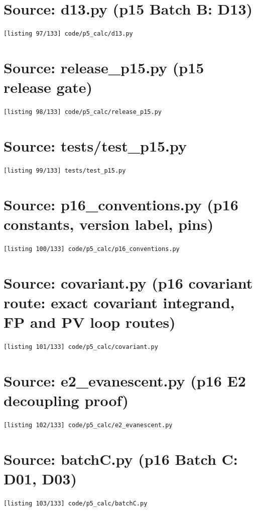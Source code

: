 \section{Source: d13.py (p15 Batch B: D13)}
\noindent\texttt{[listing 97/133] code/p5\_calc/d13.py}
{\scriptsize}

\section{Source: release\_p15.py (p15 release gate)}
\noindent\texttt{[listing 98/133] code/p5\_calc/release\_p15.py}
{\scriptsize}

\section{Source: tests/test\_p15.py}
\noindent\texttt{[listing 99/133] tests/test\_p15.py}
{\scriptsize}

\section{Source: p16\_conventions.py (p16 constants, version label, pins)}
\noindent\texttt{[listing 100/133] code/p5\_calc/p16\_conventions.py}
{\scriptsize}

\section{Source: covariant.py (p16 covariant route: exact covariant integrand, FP and PV loop routes)}
\noindent\texttt{[listing 101/133] code/p5\_calc/covariant.py}
{\scriptsize}

\section{Source: e2\_evanescent.py (p16 E2 decoupling proof)}
\noindent\texttt{[listing 102/133] code/p5\_calc/e2\_evanescent.py}
{\scriptsize}

\section{Source: batchC.py (p16 Batch C: D01, D03)}
\noindent\texttt{[listing 103/133] code/p5\_calc/batchC.py}
{\scriptsize}

